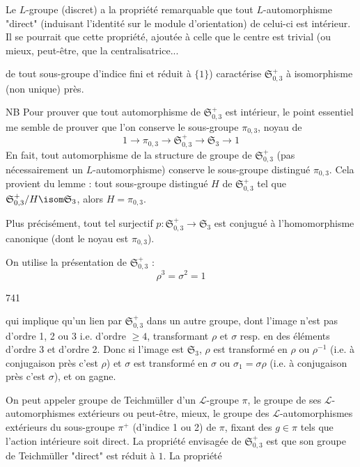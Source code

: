 Le $L$-groupe (discret) a la propriété remarquable que tout $L$-automorphisme "direct" (induisant l'identité sur le module d'orientation) de celui-ci est intérieur. Il se pourrait que cette propriété, ajoutée à celle que le centre est trivial (ou mieux, peut-être, que la centralisatrice...

\newpage


de tout sous-groupe d'indice fini et réduit à $\{1\}$) caractérise $\mathfrak{S}_{0,3}^+$ à isomorphisme (non unique) près.

NB Pour prouver que tout automorphisme de $\mathfrak{S}_{0,3}^+$ est intérieur, le point essentiel me semble de prouver que l'on conserve le sous-groupe $\pi_{0,3}$, noyau de
$$
1 \to \pi_{0,3} \to \mathfrak{S}_{0,3}^+ \to \mathfrak{S}_3 \to 1
$$
En fait, tout automorphisme de la structure de groupe de $\mathfrak{S}_{0,3}^+$ (pas nécessairement un $L$-automorphisme) conserve le sous-groupe distingué $\pi_{0,3}$. Cela provient du lemme : tout sous-groupe distingué $H$ de $\mathfrak{S}_{0,3}^+$ tel que $\mathfrak{S}_{0,3}^+/H \isom \mathfrak{S}_3$, alors $H = \pi_{0,3}$.

Plus précisément, tout tel surjectif $p: \mathfrak{S}_{0,3}^+ \to \mathfrak{S}_3$ est conjugué à l'homomorphisme canonique (dont le noyau est $\pi_{0,3}$).

On utilise la présentation de $\mathfrak{S}_{0,3}^+$ :
$$
\rho^3 = \sigma^2 = 1
$$

\newpage


741

qui implique qu'un lien par $\mathfrak{S}_{0,3}^+$ dans un autre groupe, dont l'image n'est pas d'ordre 1, 2 ou 3 i.e. d'ordre $\geq 4$, transformant $\rho$ et $\sigma$ resp. en des éléments d'ordre 3 et d'ordre 2. Donc si l'image est $\mathfrak{S}_3$, $\rho$ est transformé en $\rho$ ou $\rho^{-1}$ (i.e. à conjugaison près c'est $\rho$) et $\sigma$ est transformé en $\sigma$ ou $\sigma_1 = \sigma\rho$ (i.e. à conjugaison près c'est $\sigma$), et on gagne.

On peut appeler groupe de Teichmüller d'un $\mathcal{L}$-groupe $\pi$, le groupe de ses $\mathcal{L}$-automorphismes extérieurs ou peut-être, mieux, le groupe des $\mathcal{L}$-automorphismes extérieurs du sous-groupe $\pi^+$ (d'indice 1 ou 2) de $\pi$, fixant des $g \in \pi$ tels que l'action intérieure soit direct. La propriété envisagée de $\mathfrak{S}_{0,3}^+$ est que son groupe de Teichmüller "direct" est réduit à $1$. La propriété

